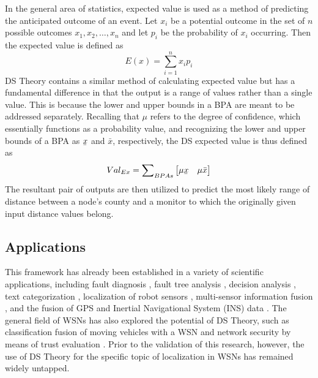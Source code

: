 \documentclass[12pt]{uthesis-v12}  %
\newcommand{\ubar}[1]{\underaccent{\bar}{#1}}
\begin{document}
In the general area of statistics, expected value is used as a method of predicting the anticipated outcome of an event. Let $x_i$ be a potential outcome in the set of $n$ possible outcomes $x_1,x_2,\dots,x_n$ and let $p_i$ be the probability of $x_i$ occurring. Then the expected value is defined as
\begin{equation}
E(x) = \sum\limits_{i=1}^n x_ip_i
\label{expval}
\end{equation}
\noindent DS Theory contains a similar method of calculating expected value but has a fundamental difference in that the output is a range of values rather than a single value. This is because the lower and upper bounds in a BPA are meant to be addressed separately. Recalling that $\mu$ refers to the degree of confidence, which essentially functions as a probability value, and recognizing the lower and upper bounds of a BPA as $\ubar{x}$ and $\bar{x}$, respectively, the DS expected value is thus defined as \cite{ipp}
\begin{equation}
Val_{Ex} = \sum\nolimits_{BPAs} 
\begin{bmatrix*} \mu \ubar{x} & \mu \bar{x} \end{bmatrix*}
\label{expval}
\end{equation}
\noindent The resultant pair of outputs are then utilized to predict the most likely range of distance between a node's county and a monitor to which the originally given input distance values belong.

\subsection{Applications}

This framework has already been established in a variety of scientific applications, including fault diagnosis \cite{deng}, fault tree analysis \cite{limbourg}, decision analysis \cite{beynon}, text categorization \cite{sarinnapakom}, localization of robot sensors \cite{soleimanpour}, multi-sensor information fusion \cite{yi}, and the fusion of GPS and Inertial Navigational System (INS) data \cite{bhatt}. The general field of WSNs has also explored the potential of DS Theory, such as classification fusion of moving vehicles with a WSN \cite{liu} and network security by means of trust evaluation \cite{feng}. Prior to the validation of this research, however, the use of DS Theory for the specific topic of localization in WSNs has remained widely untapped.

      
\end{document}
